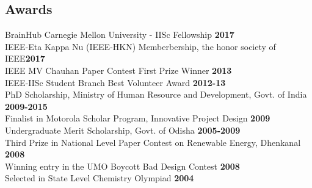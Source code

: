 \documentclass[line]{resume}
\begin{document}
{\begin{resume}
    \section{\mysidestyle Awards}
    \vspace{1mm}
    BrainHub Carnegie Mellon University - IISc Fellowship \hfill \textbf{2017} \vspace{1mm}\\%
    IEEE-Eta Kappa Nu (IEEE-HKN) Memberbership, the honor society of IEEE\hfill \textbf{2017} \vspace{1mm}\\%
    IEEE MV Chauhan Paper Contest First Prize Winner \hfill \textbf{2013}					   \vspace{1mm}\\%
    IEEE-IISc Student Branch Best Volunteer Award \hfill \textbf{2012-13}					   \vspace{1mm}\\%
    PhD Scholarship, Ministry of Human Resource and Development, Govt. of India \hfill \textbf{2009-2015} \vspace{1mm}\\%
    Finalist in Motorola Scholar Program, Innovative Project Design \hfill \textbf{2009}                          \vspace{1mm}\\%
    Undergraduate Merit Scholarship, Govt. of Odisha \hfill \textbf{2005-2009}                             \vspace{1mm}\\%
    Third Prize in National Level Paper Contest on Renewable Energy, Dhenkanal \hfill \textbf{2008}               \vspace{1mm}\\%
    Winning entry in the UMO Boycott Bad Design Contest \hfill \textbf{2008}                                      \vspace{1mm}\\%
    Selected in State Level Chemistry Olympiad \hfill \textbf{2004}                                               
    \vspace{-1.5mm}

\end{resume}}
\end{document}
